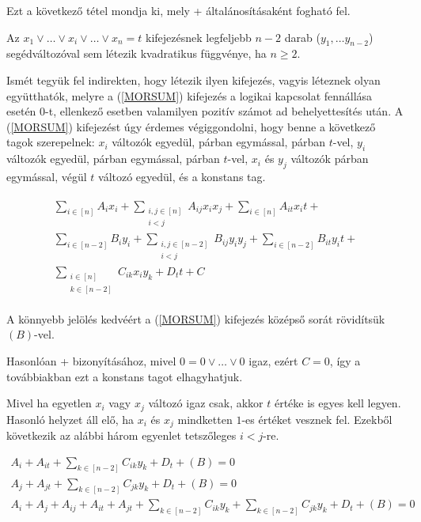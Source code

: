 
Ezt a következő tétel mondja ki, mely \az+ általánosításaként fogható fel.

\begin{theorem}
	\label{MORnotexist}
	Az $x_1 \vee \dots \vee x_i \vee  \dots \vee x_n = t$ kifejezésnek legfeljebb $n-2$ darab ($y_1, \dots y_{n-2}$) segédváltozóval sem létezik kvadratikus függvénye, ha $n \geq 2$.
	
	Ismét tegyük fel indirekten, hogy létezik ilyen kifejezés, vagyis léteznek olyan együtthatók, melyre a (\ref{MORSUM}) kifejezés a logikai kapcsolat fennállása esetén $0$-t, ellenkező esetben valamilyen pozitív számot ad behelyettesítés után. A (\ref{MORSUM}) kifejezést úgy érdemes végiggondolni, hogy benne a következő tagok szerepelnek: $x_i$ változók egyedül, párban egymással, párban $t$-vel, $y_i$ változók egyedül, párban egymással, párban $t$-vel, $x_i$ és $y_j$ változók párban egymással, végül $t$ változó egyedül, és a konstans tag.
	
	\begin{align} \label{MORSUM}	
		\begin{split}		
		\sum_{i \in \left[ n \right] }{A_{i}x_i} + \sum_{\substack{ i,j \in [n] \\  i < j} }{A_{ij}x_i x_j} + \sum_{i \in \left[ n \right] }{A_{it}x_it} +
		\\
		\sum_{i \in \left[ n-2 \right] }{B_{i}y_i} + \sum_{\substack{ i,j \in [n-2] \\  i < j} }{B_{ij}y_i y_j} + \sum_{i \in \left[ n-2 \right] }{B_{it}y_it} + 
		\\
		  \sum_{\substack{ i \in [n] \\  k \in [n-2]} }{C_{ik}x_i y_k} + D_tt		 + C
		 \end{split}
	\end{align}

	A könnyebb jelölés kedvéért a (\ref{MORSUM}) kifejezés középső sorát rövidítsük $(B)$-vel.
	
	Hasonlóan \az+ bizonyításához, mivel $0=0 \vee \dots \vee 0$ igaz, ezért $C=0$, így a továbbiakban ezt a konstans tagot elhagyhatjuk.
	
	Mivel ha egyetlen $x_i$ vagy $x_j$ változó igaz csak, akkor $t$ értéke is egyes kell legyen. Hasonló helyzet áll elő, ha $x_i$ és $x_j$ mindketten $1$-es értéket vesznek fel. Ezekből következik az alábbi három egyenlet tetszőleges $i < j$-re.
	
	\begin{align}
		A_i + A_{it} + \sum_{ k \in [n-2]}{C_{ik}y_k} + D_t + (B) =0 \label{MOR1} \\
		A_j + A_{jt} + \sum_{ k \in [n-2]}{C_{jk}y_k} + D_t + (B) =0 \label{MOR2} \\
		A_i + A_j + A_{ij} + A_{it} + A_{jt} + \sum_{k \in [n-2]}{C_{ik}y_k} + \sum_{k \in [n-2]}{C_{jk}y_k} + D_t + (B) = 0 \label{MOR3}
	\end{align}
	

\end{theorem}
